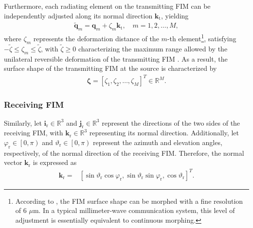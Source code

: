 \documentclass[lettersize,journal]{IEEEtran}
\begin{document}
Furthermore, each radiating element on the transmitting FIM can be independently adjusted along its normal direction $\mathbf{k}_{\textrm{t}}$, yielding
\begin{align}
 \tilde{\mathbf{q}}_{m}=\mathbf{q}_{m}+\zeta_{m}\mathbf{k}_{\textrm{t}}, \quad m = 1, 2, \ldots, M,
\end{align}
where $\zeta_{m}$ represents the deformation distance of the $m$-th element\footnote{According to \cite{Nature_2022_Bai_A}, the FIM surface shape can be morphed with a fine resolution of $6$ $\mu$m. In a typical millimeter-wave communication system, this level of adjustment is essentially equivalent to continuous morphing.}, satisfying $-\tilde{\zeta} \leq \zeta_{m} \leq \tilde{\zeta}$, with $\tilde{\zeta}\geq 0$ characterizing the maximum range allowed by the unilateral reversible deformation of the transmitting FIM \cite{Nature_2022_Bai_A}. As a result, the surface shape of the transmitting FIM at the source is characterized by
\begin{align}
 \boldsymbol{\zeta} =\left [ \zeta_{1}, \zeta_{2},\ldots , \zeta_{M} \right ]^{T}\in \mathbb{R}^{M}.
\end{align}


\subsubsection{Receiving FIM}
Similarly, let $\mathbf{i}_{\textrm{r}}\in \mathbb{R}^{3}$ and $\mathbf{j}_{\textrm{r}}\in \mathbb{R}^{3}$ represent the directions of the two sides of the receiving FIM, with $\mathbf{k}_{\textrm{r}}\in \mathbb{R}^{3}$ representing its normal direction. Additionally, let $\varphi_{\textrm{r}}\in \left [ 0,\pi \right )$ and $\vartheta_{\textrm{r}}\in \left [ 0,\pi \right )$ represent the azimuth and elevation angles, respectively, of the normal direction of the receiving FIM. Therefore, the normal vector $\mathbf{k}_{\textrm{r}}$ is expressed as
\begin{align}\label{eq7}
 \mathbf{k}_{\textrm{r}} =& \left [ \sin\vartheta_{\textrm{r}} \cos\varphi_{\textrm{r}} , \sin\vartheta_{\textrm{r}} \sin\varphi_{\textrm{r}} , \cos\vartheta_{\textrm{r}} \right ]^{T}.
\end{align}
\end{document}
